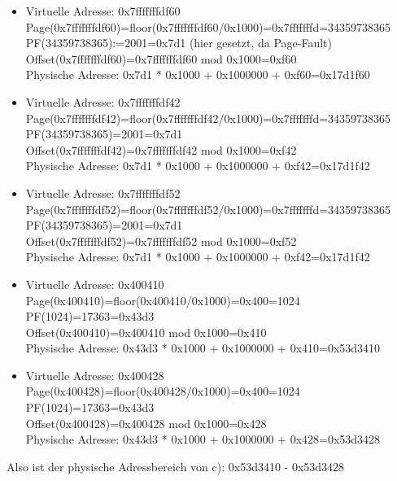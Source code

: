 \documentclass{ti2}
\begin{document}
\begin{itemize}
\item Virtuelle Adresse: 0x7fffffffdf60 
\\
Page(0x7fffffffdf60)=floor(0x7fffffffdf60/0x1000)=0x7fffffffd=34359738365
\\
PF(34359738365):=2001=0x7d1 (hier gesetzt, da Page-Fault)
\\
Offset(0x7fffffffdf60)=0x7fffffffdf60 mod 0x1000=0xf60
\\
Physische Adresse: 0x7d1 * 0x1000 + 0x1000000 + 0xf60=0x17d1f60
\item Virtuelle Adresse: 0x7fffffffdf42 
\\
Page(0x7fffffffdf42)=floor(0x7fffffffdf42/0x1000)=0x7fffffffd=34359738365
\\
PF(34359738365)=2001=0x7d1 
\\
Offset(0x7fffffffdf42)=0x7fffffffdf42 mod 0x1000=0xf42
\\
Physische Adresse: 0x7d1 * 0x1000 + 0x1000000 + 0xf42=0x17d1f42
\item Virtuelle Adresse: 0x7fffffffdf52 
\\
Page(0x7fffffffdf52)=floor(0x7fffffffdf52/0x1000)=0x7fffffffd=34359738365
\\
PF(34359738365)=2001=0x7d1 
\\
Offset(0x7fffffffdf52)=0x7fffffffdf52 mod 0x1000=0xf52
\\
Physische Adresse: 0x7d1 * 0x1000 + 0x1000000 + 0xf42=0x17d1f42

\item Virtuelle Adresse: 0x400410 
\\
Page(0x400410)=floor(0x400410/0x1000)=0x400=1024
\\
PF(1024)=17363=0x43d3
\\
Offset(0x400410)=0x400410 mod 0x1000=0x410
\\
Physische Adresse: 0x43d3 * 0x1000 + 0x1000000 + 0x410=0x53d3410
\item Virtuelle Adresse: 0x400428
\\
Page(0x400428)=floor(0x400428/0x1000)=0x400=1024
\\
PF(1024)=17363=0x43d3
\\
Offset(0x400428)=0x400428 mod 0x1000=0x428
\\
Physische Adresse: 0x43d3 * 0x1000 + 0x1000000 + 0x428=0x53d3428
\end{itemize}
Also ist der physische Adressbereich von c): 0x53d3410 - 0x53d3428
\end{document}
